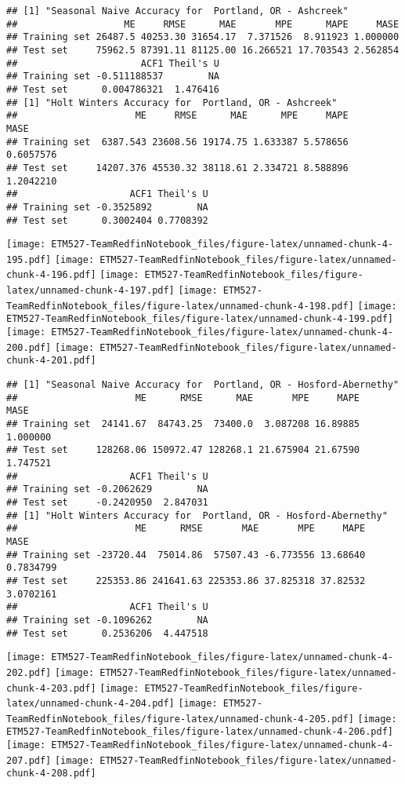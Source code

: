 \documentclass[]{article}
\begin{document}
\begin{verbatim}
## [1] "Seasonal Naive Accuracy for  Portland, OR - Ashcreek"
##                   ME     RMSE      MAE       MPE      MAPE     MASE
## Training set 26487.5 40253.30 31654.17  7.371526  8.911923 1.000000
## Test set     75962.5 87391.11 81125.00 16.266521 17.703543 2.562854
##                      ACF1 Theil's U
## Training set -0.511188537        NA
## Test set      0.004786321  1.476416
## [1] "Holt Winters Accuracy for  Portland, OR - Ashcreek"
##                     ME     RMSE      MAE      MPE     MAPE      MASE
## Training set  6387.543 23608.56 19174.75 1.633387 5.578656 0.6057576
## Test set     14207.376 45530.32 38118.61 2.334721 8.588896 1.2042210
##                    ACF1 Theil's U
## Training set -0.3525892        NA
## Test set      0.3002404 0.7708392
\end{verbatim}

\texttt{[image: ETM527-TeamRedfinNotebook\_files/figure-latex/unnamed-chunk-4-195.pdf]}
\texttt{[image: ETM527-TeamRedfinNotebook\_files/figure-latex/unnamed-chunk-4-196.pdf]}
\texttt{[image: ETM527-TeamRedfinNotebook\_files/figure-latex/unnamed-chunk-4-197.pdf]}
\texttt{[image: ETM527-TeamRedfinNotebook\_files/figure-latex/unnamed-chunk-4-198.pdf]}
\texttt{[image: ETM527-TeamRedfinNotebook\_files/figure-latex/unnamed-chunk-4-199.pdf]}
\texttt{[image: ETM527-TeamRedfinNotebook\_files/figure-latex/unnamed-chunk-4-200.pdf]}
\texttt{[image: ETM527-TeamRedfinNotebook\_files/figure-latex/unnamed-chunk-4-201.pdf]}

\begin{verbatim}
## [1] "Seasonal Naive Accuracy for  Portland, OR - Hosford-Abernethy"
##                     ME      RMSE      MAE       MPE     MAPE     MASE
## Training set  24141.67  84743.25  73400.0  3.087208 16.89885 1.000000
## Test set     128268.06 150972.47 128268.1 21.675904 21.67590 1.747521
##                    ACF1 Theil's U
## Training set -0.2062629        NA
## Test set     -0.2420950  2.847031
## [1] "Holt Winters Accuracy for  Portland, OR - Hosford-Abernethy"
##                     ME      RMSE       MAE       MPE     MAPE      MASE
## Training set -23720.44  75014.86  57507.43 -6.773556 13.68640 0.7834799
## Test set     225353.86 241641.63 225353.86 37.825318 37.82532 3.0702161
##                    ACF1 Theil's U
## Training set -0.1096262        NA
## Test set      0.2536206  4.447518
\end{verbatim}

\texttt{[image: ETM527-TeamRedfinNotebook\_files/figure-latex/unnamed-chunk-4-202.pdf]}
\texttt{[image: ETM527-TeamRedfinNotebook\_files/figure-latex/unnamed-chunk-4-203.pdf]}
\texttt{[image: ETM527-TeamRedfinNotebook\_files/figure-latex/unnamed-chunk-4-204.pdf]}
\texttt{[image: ETM527-TeamRedfinNotebook\_files/figure-latex/unnamed-chunk-4-205.pdf]}
\texttt{[image: ETM527-TeamRedfinNotebook\_files/figure-latex/unnamed-chunk-4-206.pdf]}
\texttt{[image: ETM527-TeamRedfinNotebook\_files/figure-latex/unnamed-chunk-4-207.pdf]}
\texttt{[image: ETM527-TeamRedfinNotebook\_files/figure-latex/unnamed-chunk-4-208.pdf]}
\end{document}
